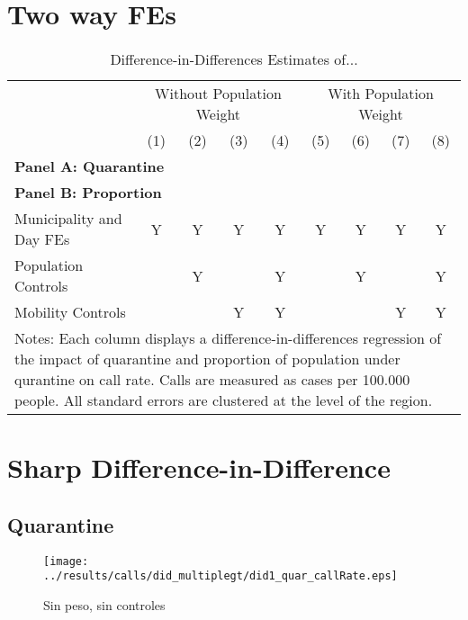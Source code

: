 \documentclass[11pt,letterpaper]{article}
\begin{document}
\section{Two way FEs}

\begin{landscape}
  \begin{table}
    \centering
    \caption{Difference-in-Differences Estimates of...} \label{tab:DD}
    \begin{tabular}{lcccccccc} \toprule
      &\multicolumn{4}{c}{Without Population Weight}&\multicolumn{4}{c}{With Population Weight} \\ 
      \cmidrule(r){2-5}\cmidrule(r){6-9}
      &(1)&(2)&(3)&(4)&(5)&(6)&(7)&(8) \\ \midrule
      \multicolumn{9}{l}{\textbf{Panel A: Quarantine}} \\
       \midrule
      \multicolumn{9}{l}{\textbf{Panel B: Proportion}} \\
      
      \midrule
      Municipality and Day FEs &Y&Y&Y&Y&Y&Y&Y&Y \\
      Population Controls      & &Y& &Y& &Y& &Y \\
      Mobility Controls        & & &Y&Y& & &Y&Y \\
      \bottomrule
      \multicolumn{9}{p{21.8cm}}{{\footnotesize Notes: Each column displays a difference-in-differences regression of the impact of quarantine and proportion of population under qurantine on call rate. Calls are measured as cases per 100.000 people.  All standard errors are clustered at the level of the region.}}
    \end{tabular}
  \end{table}
\end{landscape}

\section{Sharp Difference-in-Difference}
	\subsection{Quarantine}
\begin{figure}[H]
\caption{Sin peso, sin controles}
\centering
\texttt{[image: ../results/calls/did\_multiplegt/did1\_quar\_callRate.eps]}
\end{figure}
\end{document}

